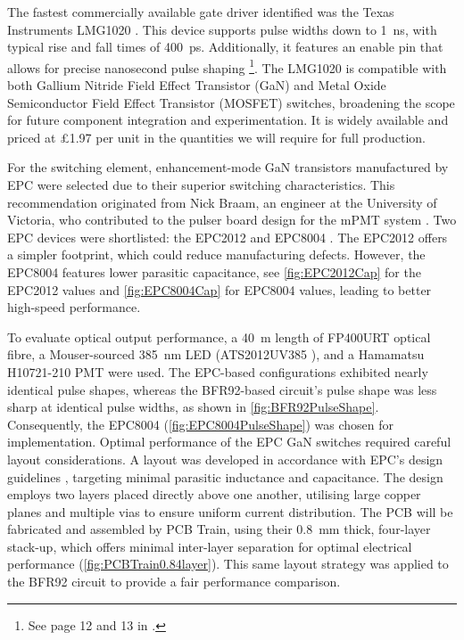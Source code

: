 \documentclass[a4paper,11pt]{article}
\begin{document}
The fastest commercially available gate driver identified was the Texas Instruments LMG1020 \cite{LMG1020}. This device supports pulse widths down to 1~ns, with typical rise and fall times of 400~ps. Additionally, it features an enable pin that allows for precise nanosecond pulse shaping \footnote{See page 12 and 13 in \cite{LMG1020}.}. The LMG1020 is compatible with both Gallium Nitride Field Effect Transistor (GaN) and Metal Oxide Semiconductor Field Effect Transistor (MOSFET) switches, broadening the scope for future component integration and experimentation. It is widely available and priced at £1.97 per unit in the quantities we will require for full production.

For the switching element, enhancement-mode GaN transistors manufactured by EPC were selected due to their superior switching characteristics. This recommendation originated from Nick Braam, an engineer at the University of Victoria, who contributed to the pulser board design for the mPMT system \cite{TN52}. Two EPC devices were shortlisted: the EPC2012 \cite{EPC2012} and EPC8004 \cite{EPC8004}. The EPC2012 offers a simpler footprint, which could reduce manufacturing defects. However, the EPC8004 features lower parasitic capacitance, see \cref{fig:EPC2012Cap} for the EPC2012 values and \cref{fig:EPC8004Cap} for EPC8004 values, leading to better high-speed performance.

To evaluate optical output performance, a 40~m length of FP400URT \cite{FP400URT} optical fibre, a Mouser-sourced 385~nm LED (ATS2012UV385 \cite{ATS2012UV385}), and a Hamamatsu H10721-210 \cite{H10721-210} PMT were used. The EPC-based configurations exhibited nearly identical pulse shapes, whereas the BFR92-based circuit's pulse shape was less sharp at identical pulse widths, as shown in \cref{fig:BFR92PulseShape}. Consequently, the EPC8004 (\cref{fig:EPC8004PulseShape}) was chosen for implementation. Optimal performance of the EPC GaN switches required careful layout considerations. A layout was developed in accordance with EPC's design guidelines \cite{EPCHSGuide}, targeting minimal parasitic inductance and capacitance. The design employs two layers placed directly above one another, utilising large copper planes and multiple vias to ensure uniform current distribution. The PCB will be fabricated and assembled by PCB Train, using their 0.8~mm thick, four-layer stack-up, which offers minimal inter-layer separation for optimal electrical performance (\cref{fig:PCBTrain0.84layer}). This same layout strategy was applied to the BFR92 circuit to provide a fair performance comparison.
\end{document}
